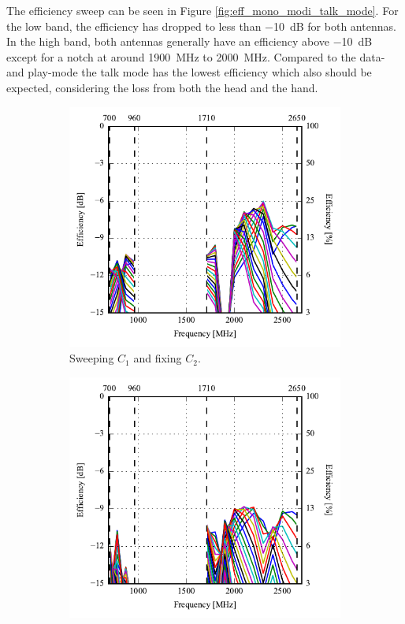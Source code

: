 The efficiency sweep can be seen in Figure \ref{fig:eff_mono_modi_talk_mode}. For the low band, the efficiency has dropped to less than \SI{-10}{dB} for both antennas. In the high band, both antennas generally have an efficiency above \SI{-10}{dB} except for a notch at around \SI{1900}{MHz} to \SI{2000}{MHz}. Compared to the data- and play-mode the talk mode has the lowest efficiency which also should be expected, considering the loss from both the head and the hand.
\begin{figure}[htbp]
    \centering
    \begin{subfigure}{0.49\linewidth}
        \includegraphics{img/tech_sol/monopole/highband/ue/talkmode/eff_top.pdf}
        \caption{Sweeping $C_1$ and fixing $C_2$.}
    \end{subfigure}
    \hfill
    \begin{subfigure}{0.49\linewidth}
        \includegraphics{img/tech_sol/monopole/highband/ue/talkmode/eff_side.pdf}

\end{subfigure}
\end{figure}
